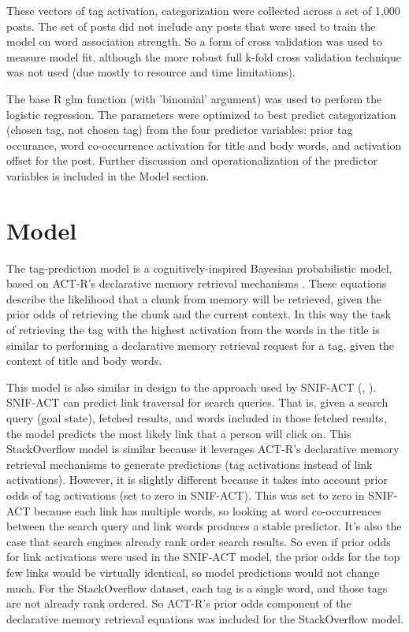 \documentclass[10pt,letterpaper]{article}
\begin{document}
These vectors of tag activation, categorization were collected across a set of 1,000 posts.
The set of posts did not include any posts that were used to train the model on word association strength.
So a form of cross validation was used to measure model fit, although the more robust full k-fold cross validation technique was not used (due mostly to resource and time limitations).

The base R glm function (with 'binomial' argument) was used to perform the logistic regression.
The parameters were optimized to best predict categorization (chosen tag, not chosen tag) from the four predictor variables:
prior tag occurance, word co-occurrence activation for title and body words, and activation offset for the post.
Further discussion and operationalization of the predictor variables is included in the Model section.

\section{Model}

The tag-prediction model is a cognitively-inspired Bayesian probabilistic model, based on ACT-R's declarative memory retrieval mechanisms \cite{Anderson2004}.
These equations describe the likelihood that a chunk from memory will be retrieved, given the prior odds of retrieving the chunk and the current context.
In this way the task of retrieving the tag with the highest activation from the words in the title is similar to performing a declarative memory retrieval request for a tag, given the context of title and body words.

This model is also similar in design to the approach used by SNIF-ACT (, ). 
SNIF-ACT can predict link traversal for search queries.
That is, given a search query (goal state), fetched results, and words included in those fetched results, the model predicts the most likely link that a person will click on.
This StackOverflow model is similar because it leverages ACT-R's declarative memory retrieval mechanisms to generate predictions (tag activations instead of link activations).
However, it is slightly different because it takes into account prior odds of tag activations (set to zero in SNIF-ACT).
This was set to zero in SNIF-ACT because each link has multiple words, so looking at word co-occurrences between the search query and link words produces a stable predictor.
It's also the case that search engines already rank order search results.
So even if prior odds for link activations were used in the SNIF-ACT model, the prior odds for the top few links would be virtually identical, so model predictions would not change much.
For the StackOverflow dataset, each tag is a single word, and those tags are not already rank ordered.
So ACT-R's prior odds component of the declarative memory retrieval equations was included for the StackOverflow model.
\end{document}

